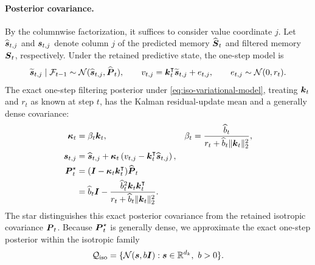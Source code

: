 \documentclass{article} %
\begin{document}
\paragraph{Posterior covariance.}
By the columnwise factorization, it suffices to consider value coordinate $j$. Let
$\widehat{\boldsymbol{s}}_{t,j}$ and $\boldsymbol{s}_{t,j}$ denote column $j$ of the predicted memory
$\widehat{\boldsymbol{S}}_t$ and filtered memory $\boldsymbol{S}_t$, respectively. Under the retained predictive
state, the one-step model is
\begin{equation}
  \widetilde{\boldsymbol{s}}_{t,j}\mid\mathcal{F}_{t-1}
  \sim\mathcal N(\widehat{\boldsymbol{s}}_{t,j},\widehat{\boldsymbol{P}}_t),
  \qquad
  v_{t,j}=\boldsymbol{k}_t^{\intercal}\widetilde{\boldsymbol{s}}_{t,j}+e_{t,j},
  \qquad
  e_{t,j}\sim\mathcal N(0,r_t).
  \label{eq:iso-variational-model}
\end{equation}
The exact one-step filtering posterior under \eqref{eq:iso-variational-model}, treating
$\boldsymbol{k}_t$ and $r_t$ as known at step $t$, has the Kalman residual-update mean and a generally
dense covariance:
\begin{equation}
\begin{aligned}
  \boldsymbol{\kappa}_t
  &=\beta_t\boldsymbol{k}_t,
  &
  \beta_t
  &=\frac{\widehat b_t}{r_t+\widehat b_t\|\boldsymbol{k}_t\|_2^2},
  \\
  \boldsymbol{s}_{t,j}
  &=\widehat{\boldsymbol{s}}_{t,j}
    +\boldsymbol{\kappa}_t
      \left(v_{t,j}-\boldsymbol{k}_t^{\intercal}\widehat{\boldsymbol{s}}_{t,j}\right),
  \\
  \boldsymbol{P}_t^\star
  &=(\boldsymbol{I}-\boldsymbol{\kappa}_t\boldsymbol{k}_t^{\intercal})\widehat{\boldsymbol{P}}_t
  \\
  &=\widehat b_t\boldsymbol{I}
   -\frac{\widehat b_t^2\boldsymbol{k}_t\boldsymbol{k}_t^{\intercal}}
    {r_t+\widehat b_t\|\boldsymbol{k}_t\|_2^2}.
\end{aligned}
  \label{eq:iso-exact-posterior}
\end{equation}
The star distinguishes this exact posterior covariance from the retained isotropic covariance
$\boldsymbol{P}_t$. Because $\boldsymbol{P}_t^\star$ is generally dense, we approximate the exact one-step
posterior within the isotropic family
\begin{equation*}
  \mathcal{Q}_{\mathrm{iso}}
  =\{\mathcal N(\boldsymbol{s},b\boldsymbol{I}):\boldsymbol{s}\in\mathbb{R}^{d_k},\ b>0\}.
\end{equation*}
\end{document}
